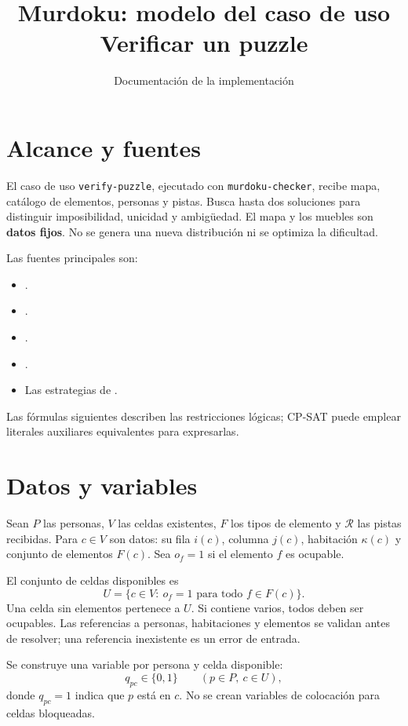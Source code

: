 \documentclass[11pt,a4paper]{article}
\title{Murdoku: modelo del caso de uso\\Verificar un puzzle}
\author{Documentaci\'on de la implementaci\'on}
\date{}
\newcommand{\B}{\{0,1\}}
\begin{document}
\maketitle

\section{Alcance y fuentes}

El caso de uso \texttt{verify-puzzle}, ejecutado con
\texttt{murdoku-checker}, recibe mapa, cat\'alogo de elementos, personas
y pistas. Busca hasta dos soluciones para distinguir imposibilidad,
unicidad y ambig\"uedad. El mapa y los muebles son \textbf{datos fijos}.
No se genera una nueva distribuci\'on ni se optimiza la dificultad.

Las fuentes principales son:
\begin{itemize}
  \item {}.
  \item {}.
  \item {}.
  \item {}.
  \item Las estrategias de .
\end{itemize}
Las f\'ormulas siguientes describen las restricciones l\'ogicas;
CP-SAT puede emplear literales auxiliares equivalentes para expresarlas.

\section{Datos y variables}

Sean $P$ las personas, $V$ las celdas existentes, $F$ los tipos de
elemento y $\mathcal R$ las pistas recibidas. Para $c\in V$ son datos:
su fila $i(c)$, columna $j(c)$, habitaci\'on $\kappa(c)$ y conjunto
de elementos $F(c)$. Sea $o_f=1$ si el elemento $f$ es ocupable.

El conjunto de celdas disponibles es
\[
 U=\{c\in V:\ o_f=1\text{ para todo }f\in F(c)\}.
\]
Una celda sin elementos pertenece a $U$. Si contiene varios, todos
deben ser ocupables. Las referencias a personas, habitaciones y
elementos se validan antes de resolver; una referencia inexistente
es un error de entrada.

Se construye una variable por persona y celda disponible:
\[
 q_{pc}\in\B\qquad(p\in P,\ c\in U),
\]
donde $q_{pc}=1$ indica que $p$ est\'a en $c$. No se crean variables
de colocaci\'on para celdas bloqueadas.
\end{document}
